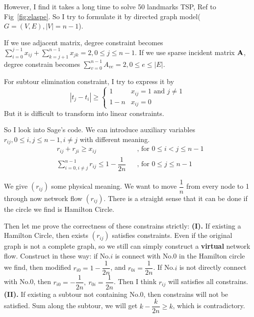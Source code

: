 \documentclass{mcmthesis}
\begin{document}
However, I find it takes a long time to solve 50 landmarks TSP, Ref to Fig~\vref{fig:elaspe}.  So I try to formulate it by directed graph model($G=(V,E),|V|=n-1$). 

If we use adjacent matrix, degree constraint becomes $\sum_{i=0}^{j-1}x_{ij}+\sum_{k=j+1}^{n-1}x_{jk}=2,0 \le j \le n-1$. If we use sparse incident matrix $\mathbf{A}$, degree constrain becomes $\sum_{v=0}^{n-1}A_{ve}=2, 0 \le e \le |E| $. 

For subtour elimination constraint, I try to express it by $$	|t_j-t_i| \ge \begin{cases}
 1 & {x_{ij}=1 \text{ and  } j \ne 1 }\\
   1-n & {x_{ij}=0}
\end{cases}$$ But it is difficult to transform into linear constraints. 

So I look into Sage's code\cite{bib:github/sage/tsp}. We can introduce auxiliary variables $r_{ij},0\le i,j\le n-1,i\ne j$ with different meaning.  
\begin{align}
	 & r_{ij}+r_{ji} \ge x_{ij}                          &  & \text{, for }  0\le i<j\le n-1 \\
	 & \sum_{i=0,i\ne j}^{n-1} r_{ij}\le 1-\dfrac{1}{2n} &   & \text{, for } 0 \le j \le n-1
\end{align}

We give  $(r_{ij})$ some physical meaning. We want to move $\dfrac{1}{n}$ from every node to 1 through now network flow $(r_{ij})$. There is a straight  sense that it can be done if the circle we find is Hamilton Circle. 

Then let me prove the correctness of these constrains strictly:   \quad
\textbf{(I).} If existing a Hamilton Circle, then exists $(r_{ij})$ satisfies constraints. Even if the original graph is not a complete graph, so we still can simply construct a \textbf{virtual} network flow. Construct in these way: if No.$i$ is connect with No.0 in the Hamilton circle we find, then modified $r_{i0}=1-\dfrac{1}{2n}$, and $r_{0i}=\dfrac{1}{2n}$. If No.$i$ is not directly connect with No.0, then  $r_{i0}= -\dfrac{1}{2n},\  r_{0i}=\dfrac{1}{2n}$. Then I think $r_{ij}$ will satisfies all constrains.
 \quad \textbf{(II).} If existing  a subtour not containing No.0, then  constrains will not be satisfied. Sum along the subtour, we will get $k-\dfrac{k}{2n} \ge k$, which is contradictory.
\end{document}
